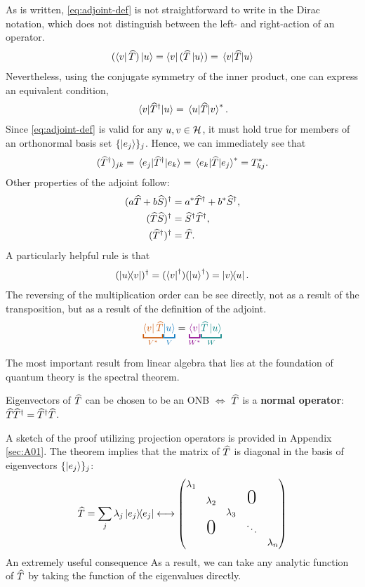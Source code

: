 As is written, \eqref{eq:adjoint-def} is not straightforward to write in the Dirac notation, which does not distinguish between the left- and right-action of an operator. 
\begin{align}
	(\bra{v}\widehat{T})\ket{u} = \bra{v} (\widehat{T} \ket{u}) = \mel{v}{\widehat{T}}{u} 
\end{align}
Nevertheless, using the conjugate symmetry of the inner product, one can express an equivalent condition,
\begin{align}
	\mel{v}{\widehat{T}^{\dagger}}{u} =\mel{u}{\widehat{T}}{v}^*.
\end{align}
Since \eqref{eq:adjoint-def} is valid for any $u,v\in\mathcal{H}$, it must hold true for members of an orthonormal basis set $\{\ket{e_j}\}_j$. Hence, we can immediately see that
\begin{align}
	(\widehat{T}^{\dagger})_{jk} = \mel{e_j}{\widehat{T}^{\dagger}}{e_k} = \mel{e_k}{\widehat{T}}{e_j}^* = T_{kj}^*.
\end{align} 
Other properties of the adjoint follow:
\begin{align}
	(a\widehat{T} + b\widehat{S})^{\dagger} &= a^* \widehat{T}^{\dagger} + b^* \widehat{S}^{\dagger}, \\
	(\widehat{T} \widehat{S})^{\dagger} &= \widehat{S}^{\dagger} \widehat{T}^{\dagger}, \\
	(\widehat{T}^{\dagger})^{\dagger} &= \widehat{T}.
\end{align}
A particularly helpful rule is that
\begin{align}
	(\dyad{u}{v})\dgg = (\bra v\dgg)(\ket u\dgg) = \dyad{v}{u}.
\end{align}
The reversing of the multiplication order can be see directly, not as a result of the transposition, but as a result of the definition of the adjoint.
\begin{align}
	{\color{maincolor}\underbracket{\bra v \op T}_{V^*}} {\color{eqcolor}\underbracket{\ket u}_{V}} = {\color{darkmagenta}\underbracket{\bra v}_{W^*}}  {\color{teal}\underbracket{\op T \ket u}_{W}}
\end{align}

The most important result from linear algebra that lies at the foundation of quantum theory is the spectral theorem.

\begin{theorem}\leavevmode
	
	Eigenvectors of $\widehat{T}$ can be chosen to be an ONB $\iff$ $\widehat{T}$ is a {\bf normal operator}: $\widehat{T} \widehat{T}^{\dagger} = \widehat{T}^{\dagger} \widehat{T}$.
\end{theorem}
\noindent A sketch of the proof utilizing projection operators is provided in Appendix \ref{sec:A01}. The theorem implies that the matrix of $\widehat{T}$ is diagonal in the basis of eigenvectors $\{\ket{e_j}\}_j$:
\begin{align}
	\op T = \sum_j \lambda_j \dyad{e_j} \longleftrightarrow \mqty(\lambda_1&&&&
\\&\lambda_2&&\text{\huge0}&\\&&\lambda_3&&\\&\text{\huge0}&&\ddots&\\&&&&\lambda_n)
\end{align}
An extremely useful consequence
As a result, we can take any analytic function of $\widehat{T}$ by taking the function of the eigenvalues directly. 


